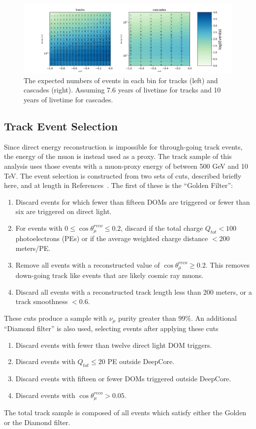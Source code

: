 \documentclass[main.tex]{subfiles}
\begin{document}
\begin{figure}
    \centering
    \includegraphics[width=0.8\linewidth]{figures/realization_joint.png}
    \caption{The expected numbers of events in each bin for tracks (left) and cascades (right). Assuming 7.6 years of livetime for tracks and 10 years of livetime for cascades.}\label{fig:event_no}
\end{figure}


\subsection{Track Event Selection}

Since direct energy reconstruction is impossible for through-going track events, the energy of the muon is instead used as a proxy.
The track sample of this analysis uses those events with a muon-proxy energy of between 500 GeV and 10 TeV. 
The event selection is constructed from two sets of cuts, described briefly here, and at length in References~\cite{Aartsen_2020, Aartsen_2020_prd, axani2020sterile}. %
The first of these is the ``Golden Filter'':

\begin{enumerate}
    \item Discard events for which fewer than fifteen DOMs are triggered or fewer than six are triggered on direct light.
    \item  For events with $0\leq\cos\theta_{\mu}^{reco}\leq 0.2$, discard if the total charge $Q_{tot}<100$ photoelectrons (PEs) or if the average weighted charge distance $<200$ meters/PE. 
    \item Remove all events with a reconstructed value of $\cos\theta_{\mu}^{reco}\geq 0.2$. This removes down-going track like events that are likely cosmic ray muons. 
    \item Discard all events with a reconstructed track length less than 200 meters, or a track smoothness $<0.6$.
\end{enumerate}

These cuts produce a sample with $\nu_{\mu}$ purity greater than 99\%. %
An additional ``Diamond filter'' is also used, selecting events after applying these cuts
\begin{enumerate}
    \item Discard events with fewer than twelve direct light DOM triggers. 
    \item Discard events with $Q_{tot}\leq20$ PE outside DeepCore. 
    \item Discard events with fifteen or fewer DOMs triggered outside DeepCore. 
    \item Discard events with $\cos\theta_{\mu}^{reco}>0.05$.
\end{enumerate}
The total track sample is composed of all events which satisfy either the Golden or the Diamond filter. 
\end{document}
